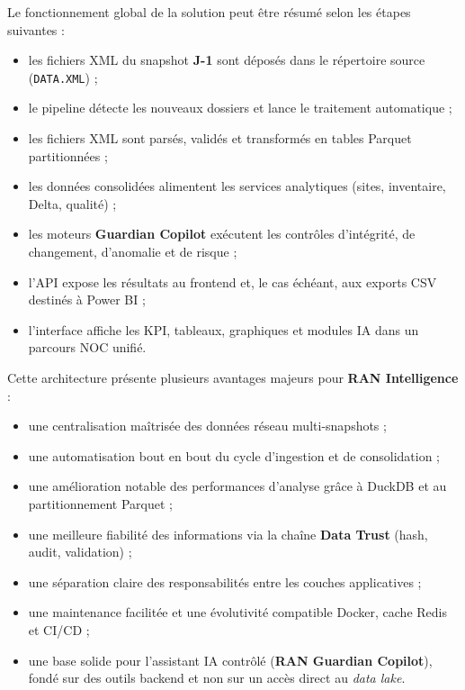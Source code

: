 \documentclass[12pt,a4paper]{report}
\begin{document}
\begin{flushleft}
\vspace{0.3cm}

Le fonctionnement global de la solution peut être résumé selon les étapes suivantes :

\begin{itemize}
    \item les fichiers XML du snapshot \textbf{J-1} sont déposés dans le répertoire source (\texttt{DATA.XML}) ;
    \item le pipeline détecte les nouveaux dossiers et lance le traitement automatique ;
    \item les fichiers XML sont parsés, validés et transformés en tables Parquet partitionnées ;
    \item les données consolidées alimentent les services analytiques (sites, inventaire, Delta, qualité) ;
    \item les moteurs \textbf{Guardian Copilot} exécutent les contrôles d'intégrité, de changement, d'anomalie et de risque ;
    \item l'API expose les résultats au frontend et, le cas échéant, aux exports CSV destinés à Power BI ;
    \item l'interface affiche les KPI, tableaux, graphiques et modules IA dans un parcours NOC unifié.
\end{itemize}

Cette architecture présente plusieurs avantages majeurs pour \textbf{RAN Intelligence} :

\begin{itemize}
    \item une centralisation maîtrisée des données réseau multi-snapshots ;
    \item une automatisation bout en bout du cycle d'ingestion et de consolidation ;
    \item une amélioration notable des performances d'analyse grâce à DuckDB et au partitionnement Parquet ;
    \item une meilleure fiabilité des informations via la chaîne \textbf{Data Trust} (hash, audit, validation) ;
    \item une séparation claire des responsabilités entre les couches applicatives ;
    \item une maintenance facilitée et une évolutivité compatible Docker, cache Redis et CI/CD ;
    \item une base solide pour l'assistant IA contrôlé (\textbf{RAN Guardian Copilot}), fondé sur des outils backend et non sur un accès direct au \textit{data lake}.
\end{itemize}


\end{flushleft}
\end{document}
